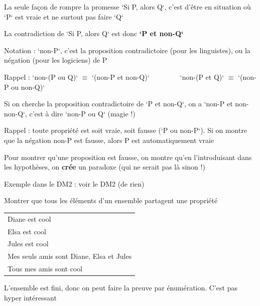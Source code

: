 \begin{frame}
	
La seule façon de rompre la promesse `Si P, alors Q`, c'est d'être en situation où `P` est vraie et ne surtout pas faire `Q`\newline \pause

La contradiction de `Si P, alors Q` est donc \pause \textbf{`P et non-Q`} \newline \pause

Notation : `non-P`, c'est la proposition contradictoire (pour les linguistes), ou la négation (pour les logiciens) de P \pause \newline

Rappel : `non-(P ou Q)` $\equiv$ `(non-P et non-Q)`\newline
\textcolor{white}{Rappel :} `non-(P et Q)` $\equiv$ `(non-P ou non-Q)` \newline \pause

Si on cherche la proposition contradictoire de `P et non-Q`, on a `non-P et non-non-Q`\pause, c'est à dire `non-P ou Q` \pause (magie !)

\end{frame}



\begin{frame}

Rappel : toute propriété est soit vraie, soit fausse (`P ou non-P`). \pause Si on montre que la négation non-P est fausse, alors P est automatiquement vraie\pause\newline

Pour montrer qu'une proposition est fausse, on montre qu'en l'introduisant dans les hypothèses, on \textbf{crée} un paradoxe \pause (qui ne serait pas là sinon !)\pause\newline 
	
Exemple dans le DM2 : \pause voir le DM2 (de rien)

\end{frame}


\begin{frame}
	
		\begin{description}[labelindent=6pt,style=multiline,leftmargin=1.3in]
		 \setlength\itemsep{1em}
		 \item[En gros] Montrer que tous les éléments d'un ensemble partagent une propriété\pause
		 \item[Exemple bourrin] \begin{tabular}[t]{l}
Diane est cool\\
Elsa est cool\\
Jules est cool\\
Mes seuls amis sont Diane, Elsa et Jules\\
\hline
Tous mes amis sont cool
\end{tabular}\pause
		 \item[Remarque] L'ensemble est fini, donc on peut faire la preuve par énumération. \pause C'est pas hyper intéressant
  	\end{description}

\end{frame}

